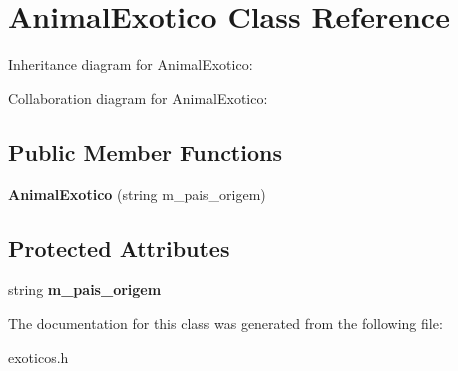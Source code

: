 \hypertarget{classAnimalExotico}{}\section{Animal\+Exotico Class Reference}
\label{classAnimalExotico}


Inheritance diagram for Animal\+Exotico\+:


Collaboration diagram for Animal\+Exotico\+:
\subsection*{Public Member Functions}
\begin{DoxyCompactItemize}
\item 
\mbox{\label{classAnimalExotico_a2c39d629f2f86770701b3fb52b8f4be0}} 
{\bfseries Animal\+Exotico} (string m\+\_\+pais\+\_\+origem)
\end{DoxyCompactItemize}
\subsection*{Protected Attributes}
\begin{DoxyCompactItemize}
\item 
\mbox{\label{classAnimalExotico_a2e1499bcba101bdba2cbe9f9e5f94b54}} 
string {\bfseries m\+\_\+pais\+\_\+origem}
\end{DoxyCompactItemize}


The documentation for this class was generated from the following file\+:\begin{DoxyCompactItemize}
\item 
exoticos.\+h\end{DoxyCompactItemize}
